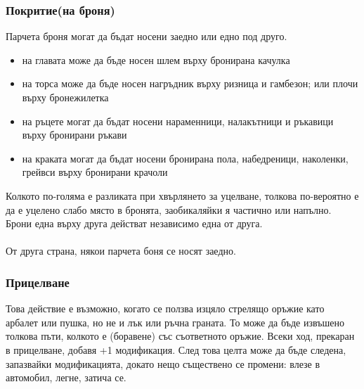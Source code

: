 \subsubsection{Покритие(на броня)}
Парчета броня могат да бъдат носени заедно или едно под друго.
\begin{itemize}
\item{на главата може да бъде носен шлем върху бронирана качулка}
\item{на торса може да бъде носен нагръдник върху ризница и гамбезон; или плочи върху бронежилетка}
\item{на ръцете могат да бъдат носени нараменници, налакътници и ръкавици върху бронирани ръкави}
\item{на краката могат да бъдат носени бронирана пола, набедреници, наколенки, грейвси върху бронирани крачоли}
\end{itemize}

Колкото по-голяма е разликата при хвърлянето за уцелване, толкова по-вероятно е да е уцелено слабо място в бронята, заобикаляйки я частично или напълно.
Брони една върху друга действат независимо една от друга.
\\
\\
От друга страна, някои парчета боня се носят заедно.
\\


\subsubsection{Прицелване}
Това действие е възможно, когато се ползва изцяло стрелящо оръжие като арбалет или пушка, но не и лък или ръчна граната.
То може да бъде извъшено толкова пъти, колкото е (боравене) със съответното оръжие.
Всеки ход, прекаран в прицелване, добавя +1 модификация.
След това целта може да бъде следена, запазвайки модификацията, докато нещо съществено се промени: влезе в автомобил, легне, затича се.


